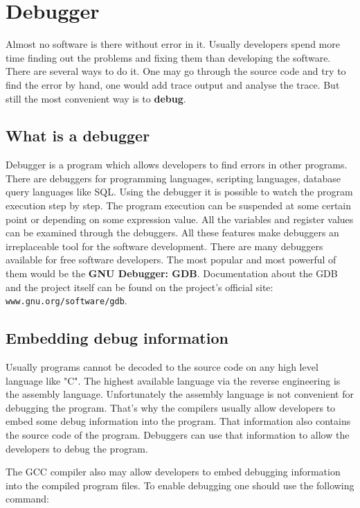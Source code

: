 
\section{Debugger}
\label{debugger}
Almost no software is there without error in it. Usually developers spend more time finding out the problems and fixing them than developing the software. There are several ways to do it. One may go through the source code and try to find the error by hand, one would add trace output and analyse the trace. But still the most convenient way is to {\bf debug}.

\subsection{What is a debugger}
Debugger is a program which allows developers to find errors in other programs. There are debuggers for programming languages, scripting languages, database query languages like SQL. Using the debugger it is possible to watch the program execution step by step. The program execution can be suspended at some certain point or depending on some expression value. All the variables and register values can be examined through the debuggers. All these features make debuggers an irreplaceable tool for the software development. There are many debuggers available for free software developers. The most popular and most powerful of them would be the {\bf GNU Debugger: GDB}. Documentation about the GDB and the project itself can be found on the project's official site: {\tt www.gnu.org/software/gdb}.

\subsection{Embedding debug information}
Usually programs cannot be decoded to the source code on any high level language like "C". The highest available language via the reverse engineering is the assembly language. Unfortunately the assembly language is not convenient for debugging the program. That's why the compilers usually allow developers to embed some debug information into the program. That information also contains the source code of the program. Debuggers can use that information to allow the developers to debug the program. 

The GCC compiler also may allow developers to embed debugging information into the compiled program files. To enable debugging one should use the following command:

